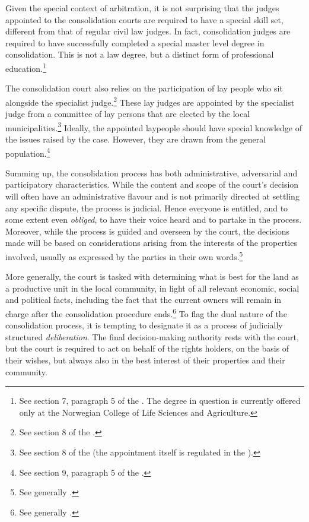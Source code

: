 Given the special context of arbitration, it is not surprising that the judges appointed to the consolidation courts are required to have a special skill set, different from that of regular civil law judges. In fact, consolidation judges are required to have successfully completed a special master level degree in consolidation. This is not a law degree, but a distinct form of professional education.\footnote{See section 7, paragraph 5 of the \cite{lca79}. The degree in question is currently offered only at the Norwegian College of Life Sciences and Agriculture.}

The consolidation court also relies on the participation of lay people who sit alongside the specialist judge.\footnote{See section 8 of the \cite{lca79}.} These lay judges are appointed by the specialist judge from a committee of lay persons that are elected by the local municipalities.\footnote{See section 8 of the \cite{lca79} (the appointment itself is regulated in the \dni\cite[64]{ca15}).} Ideally, the appointed laypeople should have special knowledge of the issues raised by the case. However, they are drawn from the general population.\footnote{See section 9, paragraph 5 of the \cite{lca79}.}

Summing up, the consolidation process has both administrative, adversarial and participatory characteristics. While the content and scope of the court's decision will often have an administrative flavour and is not primarily directed at settling any specific dispute, the process is judicial. Hence everyone is entitled, and to some extent even \emph{obliged}, to have their voice heard and to partake in the process. Moreover, while the process is guided and overseen by the court, the decisions made will be based on considerations arising from the interests of the properties involved, usually as expressed by the parties in their own words.\footnote{See generally \cite{rognes07}.}

More generally, the court is tasked with determining what is best for the land as a productive unit in the local community, in light of all relevant economic, social and political facts, including the fact that the current owners will remain in charge after the consolidation procedure ends.\footnote{See generally \cite{reiten09,sky09}.} To flag the dual nature of the consolidation process, it is tempting to designate it as a process of judicially structured \emph{deliberation}. The final decision-making authority rests with the court, but the court is required to act on behalf of the rights holders, on the basis of their wishes, but always also in the best interest of their properties and their community.

